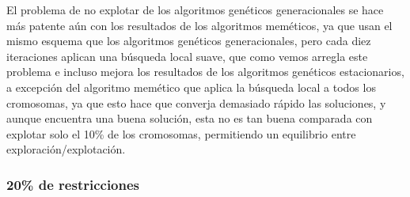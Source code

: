 \documentclass[12pt, spanish]{article}
\begin{document}
El problema de no explotar de los algoritmos genéticos generacionales se hace más patente aún con los resultados de los algoritmos meméticos, ya que usan el mismo esquema que los algoritmos genéticos generacionales, pero cada diez iteraciones aplican una búsqueda local suave, que como vemos arregla este problema e incluso mejora los resultados de los algoritmos genéticos estacionarios, a excepción del algoritmo memético que aplica la búsqueda local a todos los cromosomas, ya que esto hace que converja demasiado rápido las soluciones, y aunque encuentra una buena solución, esta no es tan buena comparada con explotar solo el 10\% de los cromosomas, permitiendo un equilibrio entre exploración/explotación.


\subsubsection{20\% de restricciones}
\end{document}
